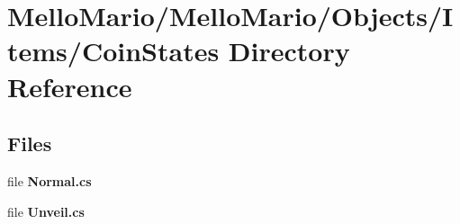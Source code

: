 \section{Mello\+Mario/\+Mello\+Mario/\+Objects/\+Items/\+Coin\+States Directory Reference}
\label{dir_0870179f67e0c4eef7921592de14bac0}
\subsection*{Files}
\begin{DoxyCompactItemize}
\item 
file \textbf{ Normal.\+cs}
\item 
file \textbf{ Unveil.\+cs}
\end{DoxyCompactItemize}
